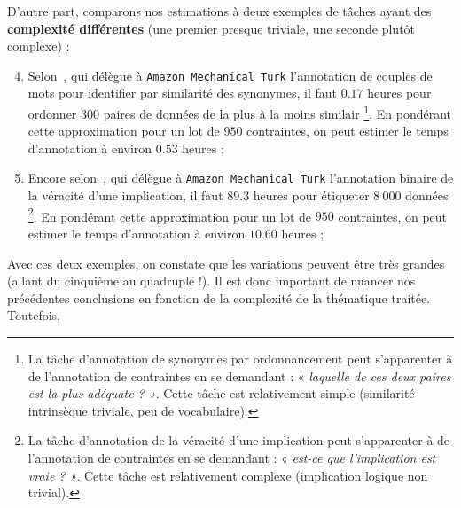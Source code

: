 			D'autre part, comparons nos estimations à deux exemples de tâches ayant des \textbf{complexité différentes} (une premier presque triviale, une seconde plutôt complexe) :
			\begin{enumerate}
				\setcounter{enumi}{3}
				\item Selon~, qui délègue à \texttt{Amazon Mechanical Turk} l'annotation de couples de mots pour identifier par similarité des synonymes, il faut $0.17$ heures pour ordonner $300$ paires de données de la plus à la moins similair
				\footnote{La tâche d'annotation de synonymes par ordonnancement peut s'apparenter à de l'annotation de contraintes en se demandant : « \textit{laquelle de ces deux paires est la plus adéquate ? »}. Cette tâche est relativement simple (similarité intrinsèque triviale, peu de vocabulaire).}. En pondérant cette approximation pour un lot de $950$ contraintes, on peut estimer le temps d'annotation à environ $0.53$ heures ;
				\item Encore selon~, qui délègue à \texttt{Amazon Mechanical Turk} l'annotation binaire de la véracité d'une implication, il faut $89.3$ heures pour étiqueter $8~000$ données
				\footnote{La tâche d'annotation de la véracité d'une implication peut s'apparenter à de l'annotation de contraintes en se demandant : « \textit{est-ce que l'implication est vraie ? »}. Cette tâche est relativement complexe (implication logique non trivial). }. En pondérant cette approximation pour un lot de $950$ contraintes, on peut estimer le temps d'annotation à environ $10.60$ heures ;
			\end{enumerate}
			Avec ces deux exemples, on constate que les variations peuvent être très grandes (allant du cinquième au quadruple !).
			Il est donc important de nuancer nos précédentes conclusions en fonction de la complexité de la thématique traitée.
			Toutefois, 
			
			
